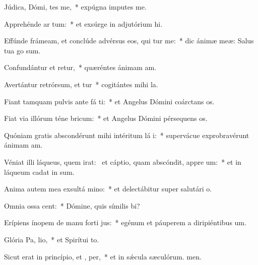\item Júdica, Dómi, tes me,~* expúgna imputes me.
\item Apprehénde ar  tum:~* et exsúrge in adjutórium hi.
\item Effúnde frámeam, et conclúde advérsus eos, qui tur me:~* dic ánimæ meæ: Salus tua go sum.
\item Confundántur et retur,~* quæréntes ánimam am.
\item Avertántur retrórsum, et tur~* cogitántes mihi la.
\item Fiant tamquam pulvis ante fá ti:~* et Angelus Dómini coárctans os.
\item Fiat via illórum téne  bricum:~* et Angelus Dómini pérsequens os.
\item Quóniam gratis abscondérunt mihi intéritum lá i:~* supervácue exprobravérunt ánimam am.
\item Véniat illi láqueus, quem irat:~\pscross{} et cáptio, quam abscóndit, appre um:~* et in láqueum cadat in sum.
\item Anima autem mea exsultá  mino:~* et delectábitur super salutári o.
\item Omnia ossa  cent:~* Dómine, quis símilis bi?
\item Erípiens ínopem de manu forti jus:~* egénum et páuperem a diripiéntibus um.
\item Glória Pa,  lio,~* et Spirítui to.
\item Sicut erat in princípio, et ,  per,~* et in sǽcula sæculórum. men.
